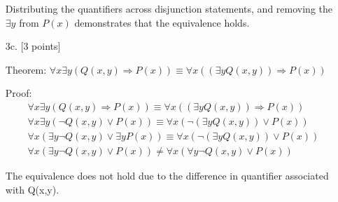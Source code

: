 \documentclass[11pt,letterpaper]{article}
\begin{document}
\begin{enumerate}
Distributing the quantifiers across disjunction statements, and removing the $\exists y$ from $P(x)$ demonstrates that the equivalence holds.


\bigskip
\item[3c.] [3 points]

Theorem:
$ \forall x \exists y (Q(x,y) \Rightarrow P(x)) \equiv \forall x ((\exists y Q(x,y)) \Rightarrow P(x)) $

Proof:
\begin{eqnarray}
\forall x \exists y (Q(x,y) \Rightarrow P(x)) \equiv \forall x ((\exists y Q(x,y)) \Rightarrow P(x)) \\
\forall x \exists y (\neg Q(x,y) \vee P(x)) \equiv \forall x (\neg (\exists y Q(x,y)) \vee P(x))  \\
\forall x (\exists y  \neg Q(x,y) \vee  \exists y P(x)) \equiv \forall x (\neg (\exists y Q(x,y)) \vee P(x))  \\
\forall x (\exists y  \neg Q(x,y) \vee  P(x)) \neq \forall x (\forall y  \neg Q(x,y) \vee P(x))
\end{eqnarray}

The equivalence does not hold due to the difference in quantifier associated with Q(x,y).

\end{enumerate}
\end{document}
